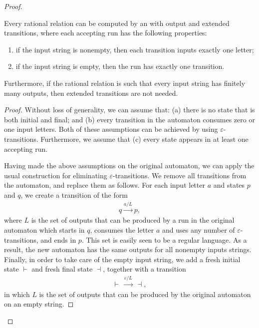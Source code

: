 \begin{proof}
        \begin{lemma}\label{lem:eliminate-epsilon-transitions}
            Every rational relation can be computed by an \nfa with output and extended transitions, where each accepting run has the following properties:
            \begin{enumerate}
                \item if the input string is nonempty, then each transition inputs exactly one letter;
                \item if the input string is empty, then the run has exactly one transition.
            \end{enumerate}
            Furthermore, if the rational relation is such that every input string has finitely many outputs, then extended transitions are not needed.
        \end{lemma}
        \begin{proof}
        Without loss of generality, we can assume that: (a) there is no state that is both initial and final; and (b) every  transition in the automaton  consumes zero or one input letters. Both of these assumptions can be achieved by using $\varepsilon$-transitions. Furthermore, we assume that (c) every state appears in at least one accepting run. 
            
        Having made the above assumptions on the original automaton, we can apply the usual construction for eliminating $\varepsilon$-transitions. We remove all transitions from the automaton, and replace them as follows. For each input letter $a$ and states $p$ and $q$, we create a transition of the form   
            \begin{align*}
            q \xrightarrow {a / L} p,
            \end{align*}
            where   $L$ is the set of outputs that can be produced by a run in the original automaton which starts in $q$, consumes the letter $a$ and  uses any number of  $\varepsilon$-transitions, and ends in $p$. This set  is easily seen to be a regular language. As a result, the new automaton has the same outputs for all nonempty inputs strings. Finally, in order to take care of the empty input string, we add a fresh initial state $\vdash$ and fresh final state $\dashv$, together with a transition 
            \begin{align*}
            \vdash\  \xrightarrow {\varepsilon / L }\ \dashv,
            \end{align*}
            in which $L$ is the set of outputs that can be produced by the original automaton on an empty string. 


\end{proof}
\end{proof}
